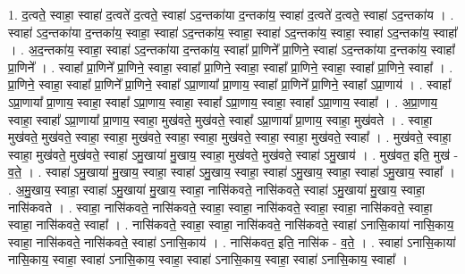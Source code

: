 \documentclass[17pt]{extarticle}
\begin{document}
1. द॒त्वते॒ स्वाहा॒ स्वाहा॑ द॒त्वते॑ द॒त्वते॒ स्वाहा॑ ऽद॒न्तका॑या द॒न्तका॑य॒ स्वाहा॑ द॒त्वते॑ द॒त्वते॒ स्वाहा॑ ऽद॒न्तका॑य । . स्वाहा॑ ऽद॒न्तका॑या द॒न्तका॑य॒ स्वाहा॒ स्वाहा॑ ऽद॒न्तका॑य॒ स्वाहा॒ स्वाहा॑ ऽद॒न्तका॑य॒ स्वाहा॒ स्वाहा॑ ऽद॒न्तका॑य॒ स्वाहा᳚ । . अ॒द॒न्तका॑य॒ स्वाहा॒ स्वाहा॑ ऽद॒न्तका॑या द॒न्तका॑य॒ स्वाहा᳚ प्रा॒णिने᳚ प्रा॒णिने॒ स्वाहा॑ ऽद॒न्तका॑या द॒न्तका॑य॒ स्वाहा᳚ प्रा॒णिने᳚ । . स्वाहा᳚ प्रा॒णिने᳚ प्रा॒णिने॒ स्वाहा॒ स्वाहा᳚ प्रा॒णिने॒ स्वाहा॒ स्वाहा᳚ प्रा॒णिने॒ स्वाहा॒ स्वाहा᳚ प्रा॒णिने॒ स्वाहा᳚ । . प्रा॒णिने॒ स्वाहा॒ स्वाहा᳚ प्रा॒णिने᳚ प्रा॒णिने॒ स्वाहा᳚ ऽप्रा॒णाया᳚ प्रा॒णाय॒ स्वाहा᳚ प्रा॒णिने᳚ प्रा॒णिने॒ स्वाहा᳚ ऽप्रा॒णाय॑ । . स्वाहा᳚ ऽप्रा॒णाया᳚ प्रा॒णाय॒ स्वाहा॒ स्वाहा᳚ ऽप्रा॒णाय॒ स्वाहा॒ स्वाहा᳚ ऽप्रा॒णाय॒ स्वाहा॒ स्वाहा᳚ ऽप्रा॒णाय॒ स्वाहा᳚ । . अ॒प्रा॒णाय॒ स्वाहा॒ स्वाहा᳚ ऽप्रा॒णाया᳚ प्रा॒णाय॒ स्वाहा॒ मुख॑वते॒ मुख॑वते॒ स्वाहा᳚ ऽप्रा॒णाया᳚ प्रा॒णाय॒ स्वाहा॒ मुख॑वते । . स्वाहा॒ मुख॑वते॒ मुख॑वते॒ स्वाहा॒ स्वाहा॒ मुख॑वते॒ स्वाहा॒ स्वाहा॒ मुख॑वते॒ स्वाहा॒ स्वाहा॒ मुख॑वते॒ स्वाहा᳚ । . मुख॑वते॒ स्वाहा॒ स्वाहा॒ मुख॑वते॒ मुख॑वते॒ स्वाहा॑ ऽमु॒खाया॑ मु॒खाय॒ स्वाहा॒ मुख॑वते॒ मुख॑वते॒ स्वाहा॑ ऽमु॒खाय॑ । . मुख॑वत॒ इति॒ मुख॑ - व॒ते॒ । . स्वाहा॑ ऽमु॒खाया॑ मु॒खाय॒ स्वाहा॒ स्वाहा॑ ऽमु॒खाय॒ स्वाहा॒ स्वाहा॑ ऽमु॒खाय॒ स्वाहा॒ स्वाहा॑ ऽमु॒खाय॒ स्वाहा᳚ । . अ॒मु॒खाय॒ स्वाहा॒ स्वाहा॑ ऽमु॒खाया॑ मु॒खाय॒ स्वाहा॒ नासि॑कवते॒ नासि॑कवते॒ स्वाहा॑ ऽमु॒खाया॑ मु॒खाय॒ स्वाहा॒ नासि॑कवते । . स्वाहा॒ नासि॑कवते॒ नासि॑कवते॒ स्वाहा॒ स्वाहा॒ नासि॑कवते॒ स्वाहा॒ स्वाहा॒ नासि॑कवते॒ स्वाहा॒ स्वाहा॒ नासि॑कवते॒ स्वाहा᳚ । . नासि॑कवते॒ स्वाहा॒ स्वाहा॒ नासि॑कवते॒ नासि॑कवते॒ स्वाहा॑ ऽनासि॒काया॑ नासि॒काय॒ स्वाहा॒ नासि॑कवते॒ नासि॑कवते॒ स्वाहा॑ ऽनासि॒काय॑ । . नासि॑कवत॒ इति॒ नासि॑क - व॒ते॒ । . स्वाहा॑ ऽनासि॒काया॑ नासि॒काय॒ स्वाहा॒ स्वाहा॑ ऽनासि॒काय॒ स्वाहा॒ स्वाहा॑ ऽनासि॒काय॒ स्वाहा॒ स्वाहा॑ ऽनासि॒काय॒ स्वाहा᳚ । \newline
\end{document}
